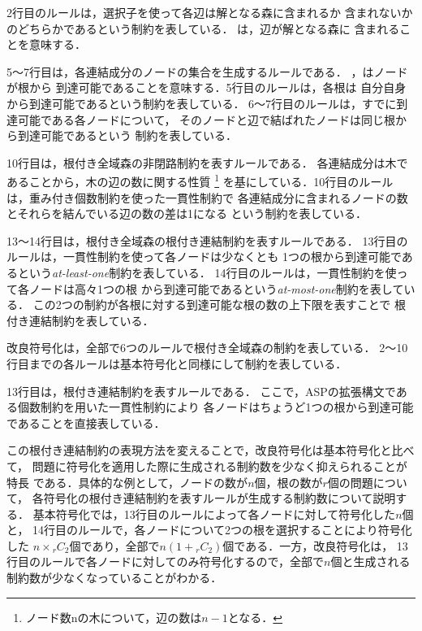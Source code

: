 2行目のルールは，選択子を使って各辺は解となる森に含まれるか
含まれないかのどちらかであるという制約を表している．
は，辺が解となる森に
含まれることを意味する．

5～7行目は，各連結成分のノードの集合を生成するルールである．
，はノードが根から
到達可能であることを意味する．5行目のルールは，各根は
自分自身から到達可能であるという制約を表している．
6～7行目のルールは，すでに到達可能である各ノードについて，
そのノードと辺で結ばれたノードは同じ根から到達可能であるという
制約を表している．

10行目は，根付き全域森の非閉路制約を表すルールである．
各連結成分は木であることから，木の辺の数に関する性質
\footnote{ノード数nの木について，辺の数は$n - 1$となる．}
を基にしている．10行目のルールは，重み付き個数制約を使った一貫性制約で
各連結成分に含まれるノードの数とそれらを結んでいる辺の数の差は1になる
という制約を表している．

13～14行目は，根付き全域森の根付き連結制約を表すルールである．
13行目のルールは，一貫性制約を使って各ノードは少なくとも
1つの根から到達可能であるという\textit{at-least-one}制約を表している．
14行目のルールは，一貫性制約を使って各ノードは高々1つの根
から到達可能であるという\textit{at-most-one}制約を表している．
この2つの制約が各根に対する到達可能な根の数の上下限を表すことで
根付き連結制約を表している．

改良符号化は，全部で6つのルールで根付き全域森の制約を表している．
2～10行目までの各ルールは基本符号化と同様にして制約を表している．

13行目は，根付き連結制約を表すルールである．
ここで，ASPの拡張構文である個数制約を用いた一貫性制約により
各ノードはちょうど1つの根から到達可能であることを直接表している．

この根付き連結制約の表現方法を変えることで，改良符号化は基本符号化と比べて，
問題に符号化を適用した際に生成される制約数を少なく抑えられることが特長
である．具体的な例として，ノードの数が$n$個，根の数が$r$個の問題について，
各符号化の根付き連結制約を表すルールが生成する制約数について説明する．
基本符号化では，13行目のルールによって各ノードに対して符号化した$n$個と，
14行目のルールで，各ノードについて2つの根を選択することにより符号化した
$n\times{}_rC_2$個であり，全部で$n(1+{}_rC_2)$個である．一方，改良符号化は，
13行目のルールで各ノードに対してのみ符号化するので，全部で$n$個と生成される
制約数が少なくなっていることがわかる．
